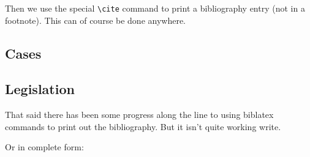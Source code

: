 \documentclass{nzlaw}
\begin{document}
Then we use the special \verb|\cite| command to print a bibliography
entry (not in a footnote). This can of course be done anywhere.

\subsection{Cases}

\cite{reekie}

\cite{mafart}

\cite{z}

\cite{astrazeneca}

\subsection{Legislation}
\cite{gaming}


That said there has been some progress along the line to using
biblatex commands to print out the bibliography. But it isn't 
quite working write.

\nocite{*}
\printbibliography[title={Cases},type=case,sorting=nyt]


Or in complete form:
\printbibliography
\end{document}
